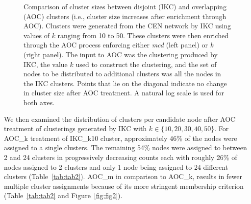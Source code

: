 \documentclass[11pt, oneside]{article}   	%
\begin{document}
\begin{figure}[H]
\begin{subfigure}[t]{0.48\textwidth}
    	\end{subfigure}
\captionsetup{width=0.9\textwidth}	
\caption{Comparison of cluster sizes between disjoint (IKC)  and overlapping (AOC) clusters (i.e., cluster size increases after enrichment through AOC). Clusters were generated from the CEN network by IKC using values of $k$ ranging from 10 to 50. These clusters were then enriched through the AOC process enforcing either \emph{mcd} (left panel) or \emph{k} (right panel). 
The input to AOC was the  clustering produced by IKC, the value $k$ used to construct the clustering, and the set of nodes to be distributed to additional clusters was all the nodes in the IKC clusters.  Points that lie on the diagonal indicate no change in cluster size after AOC treatment. A natural log scale is used for both axes.}
\label{fig:fig1}
\end{figure}

We then examined the distribution of clusters per candidate node after AOC treatment of clusterings generated by  IKC with $k \in \{10, 20, 30, 40, 50\}$. For AOC\_k treatment of IKC\_k10 cluster, approximately 46\% of the nodes were assigned to a single clusters. The remaining 54\% nodes were assigned to between 2 and 24 clusters in progressively decreasing counts each with roughly 26\% of nodes assigned to 2 clusters and only 1 node being assigned to 24 different clusters (Table~\ref{tab:tab2}). AOC\_m in comparison to AOC\_k, results in fewer multiple cluster assignments because of its more stringent membership criterion (Table~\ref{tab:tab2} and Figure~\ref{fig:fig2}).
\end{document}
